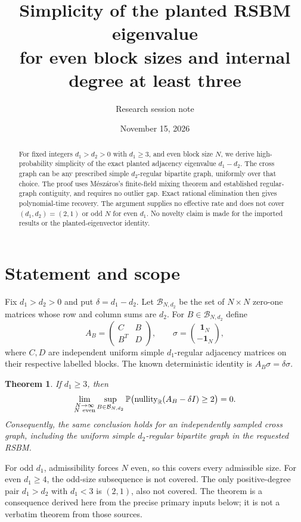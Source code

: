 \documentclass[11pt]{article}
\title{Simplicity of the planted RSBM eigenvalue\\for even block sizes and internal degree at least three}
\author{Research session note}
\date{November 15, 2026}
\newtheorem{theorem}{Theorem}
\newcommand{\one}{\mathbf 1}
\newcommand{\Prob}{\mathbb P}
\newcommand{\nullity}{\operatorname{nullity}}
\begin{document}
\maketitle
\begin{abstract}
For fixed integers $d_1>d_2>0$ with $d_1\ge3$, and even block size $N$, we derive high-probability simplicity of the exact planted adjacency eigenvalue $d_1-d_2$. The cross graph can be any prescribed simple $d_2$-regular bipartite graph, uniformly over that choice. The proof uses M\'esz\'aros's finite-field mixing theorem and established regular-graph contiguity, and requires no outlier gap. Exact rational elimination then gives polynomial-time recovery. The argument supplies no effective rate and does not cover $(d_1,d_2)=(2,1)$ or odd $N$ for even $d_1$. No novelty claim is made for the imported results or the planted-eigenvector identity.
\end{abstract}

\section{Statement and scope}
Fix $d_1>d_2>0$ and put $\delta=d_1-d_2$. Let $\mathcal B_{N,d_2}$ be the set of $N\times N$ zero-one matrices whose row and column sums are $d_2$. For $B\in\mathcal B_{N,d_2}$ define
\[
 A_B=\begin{pmatrix}C&B\\B^T&D\end{pmatrix},\qquad
 \sigma=\binom{\one_N}{-\one_N},
\]
where $C,D$ are independent uniform simple $d_1$-regular adjacency matrices on their respective labelled blocks. The known deterministic identity is $A_B\sigma=\delta\sigma$.

\begin{theorem}\label{thm:main}
If $d_1\ge3$, then
\[
 \lim_{\substack{N\to\infty\\N\ {\rm even}}}
 \sup_{B\in\mathcal B_{N,d_2}}
 \Prob\bigl(\nullity_{\mathbb R}(A_B-\delta I)\ge2\bigr)=0.
\]
Consequently, the same conclusion holds for an independently sampled cross graph, including the uniform simple $d_2$-regular bipartite graph in the requested RSBM.
\end{theorem}

For odd $d_1$, admissibility forces $N$ even, so this covers every admissible size. For even $d_1\ge4$, the odd-size subsequence is not covered. The only positive-degree pair $d_1>d_2$ with $d_1<3$ is $(2,1)$, also not covered. The theorem is a consequence derived here from the precise primary inputs below; it is not a verbatim theorem from those sources.
\end{document}
